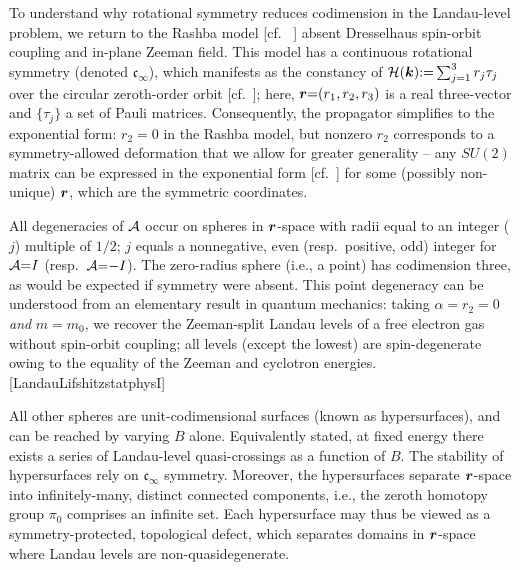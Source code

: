 \documentclass[aps, prb, showpacs, twocolumn, notitlepage, superscriptaddress]{revtex4-1}
\begin{document}

To understand why rotational symmetry reduces codimension in the Landau-level problem, we return to the Rashba model [cf. \ ] absent Dresselhaus spin-orbit coupling and in-plane Zeeman field. This model has a continuous rotational symmetry (denoted $\mathfrak{c}_{\infty}$), which manifests as the constancy of ${\cal H}(\boldsymbol{k}){:}{=}\sum_{j=1}^3r_j\tau_j$ over the circular zeroth-order orbit [cf.\ ]; here, $\boldsymbol{r}{=}(r_1,r_2,r_3)$ is a real three-vector and $\{\tau_j\}$ a set of Pauli matrices.  Consequently, the propagator  simplifies to  the exponential form:
$r_2{=}0$ in the Rashba model, but nonzero $r_2$ corresponds to a symmetry-allowed deformation that we allow for greater generality -- any $SU(2)$ matrix can be expressed in the exponential form [cf.\ ]  for some (possibly non-unique) $\boldsymbol{r}$, which are the symmetric  coordinates.  


All degeneracies of ${\cal A}$ occur on spheres in $\boldsymbol{r}$-space with radii equal to an integer ($j$)  multiple of $1/2$;  ${j}$ equals a nonnegative, even (resp.\ positive, odd) integer for  ${\cal A}{=}I$ (resp.\ ${\cal A}{=}{-}I$).  The zero-radius sphere (i.e., a point) has codimension three, as would be expected if symmetry were absent.    
This point degeneracy can be understood from an elementary result in quantum mechanics: taking $\alpha{=}r_2{=}0$ \textit{and} $m{=}m_0$, we recover the Zeeman-split Landau levels of a free electron gas without spin-orbit coupling; all levels (except the lowest) are spin-degenerate owing to the equality of the Zeeman and cyclotron energies.[LandauLifshitzstatphysI]  

All other spheres are unit-codimensional surfaces (known as hypersurfaces), and can be reached by varying $B$ alone. Equivalently stated, at fixed energy there exists a series of Landau-level quasi-crossings as a function of $B$. The stability of hypersurfaces rely on  $\mathfrak{c}_{\infty}$ symmetry. Moreover, the hypersurfaces separate $\boldsymbol{r}$-space into infinitely-many, distinct connected components, i.e., the zeroth homotopy group $\pi_0$ comprises an infinite set. Each hypersurface may thus be viewed as a symmetry-protected, topological defect, which separates domains in $\boldsymbol{r}$-space where Landau levels are non-quasidegenerate.   
\end{document}
